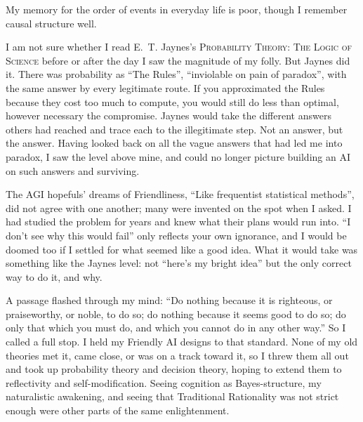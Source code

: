 My memory for the order of events in everyday life is poor, though I remember causal structure well.

I am not sure whether I read E.~T. Jaynes's \textsc{Probability Theory: The Logic of Science} before or after the day I saw the magnitude of my folly. But Jaynes did it. There was probability as ``The Rules'', ``inviolable on pain of paradox'', with the same answer by every legitimate route. If you approximated the Rules because they cost too much to compute, you would still do less than optimal, however necessary the compromise. Jaynes would take the different answers others had reached and trace each to the illegitimate step. Not an answer, but the answer. Having looked back on all the vague answers that had led me into paradox, I saw the level above mine, and could no longer picture building an AI on such answers and surviving. 

The AGI hopefuls' dreams of Friendliness, ``Like frequentist statistical methods'', did not agree with one another; many were invented on the spot when I asked. I had studied the problem for years and knew what their plans would run into. ``I don't see why this would fail'' only reflects your own ignorance, and I would be doomed too if I settled for what seemed like a good idea. What it would take was something like the Jaynes level: not ``here's my bright idea'' but the only correct way to do it, and why. 

A passage flashed through my mind: ``Do nothing because it is righteous, or praiseworthy, or noble, to do so; do nothing because it seems good to do so; do only that which you must do, and which you cannot do in any other way.''  So I called a full stop. I held my Friendly AI designs to that standard. None of my old theories met it, came close, or was on a track toward it, so I threw them all out and took up probability theory and decision theory, hoping to extend them to reflectivity and self-modification. Seeing cognition as Bayes-structure, my naturalistic awakening, and seeing that Traditional Rationality was not strict enough were other parts of the same enlightenment.

